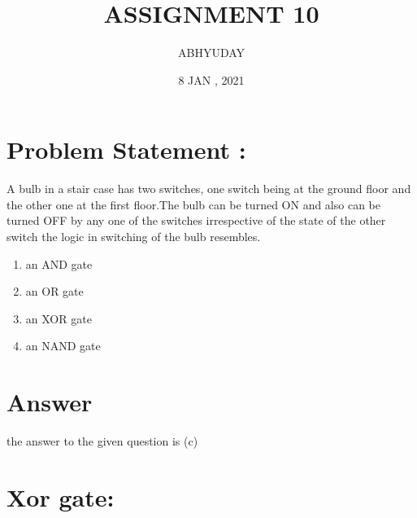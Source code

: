 \documentclass{article}
\title{ ASSIGNMENT 10}
\author{ABHYUDAY}
\date{8 JAN , 2021}
\begin{document}
\maketitle
\section{Problem Statement :}

A bulb in a stair case has two switches, one switch being at the ground floor and the other one at the first floor.The bulb can be turned ON and also can be turned OFF by any one of the switches irrespective of the state of the other switch the logic in switching of the bulb resembles.

\begin{enumerate}[label=(\Alph*)]
  \item an AND gate
\item an OR gate
\item an XOR gate
\item an NAND gate
\end{enumerate}



\maketitle
\newpage
\section{Answer}

the answer to the given question is (c)

\maketitle
\section{Xor gate:}


\end{document}
